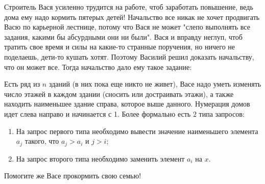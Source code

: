 Строитель Вася усиленно трудится на работе, чтоб заработать повышение, ведь дома ему надо кормить пятерых детей! Начальство все никак не хочет продвигать Васю по карьерной лестнице, потому что Вася не может "слепо выполнять все задания, какими бы абсурдными они ни были". Вася и вправду неглуп, чтоб тратить свое время и силы на какие-то странные поручения, но ничего не поделаешь, дети-то кушать хотят. Поэтому Василий решил доказать начальству, что он может все. Тогда начальство дало ему такое задание: 

Есть ряд из $n$ зданий (в них пока еще никто не живет), Васе надо уметь изменять число этажей в каждом здании (сносить или достраивать этажи), а также находить наименьшее здание справа, которое выше данного. Нумерация домов идет слева направо и начинается с 1. Более формально есть $2$ типа запросов:
\begin{enumerate}
  \item На запрос первого типа необходимо вывести значение наименьшего элемента $a_j$ такого, что $a_j > a_i$ и $j > i$;
  \item На запрос второго типа необходимо заменить элемент $a_i$ на $x$.
\end{enumerate}
Помогите же Васе прокормить свою семью!